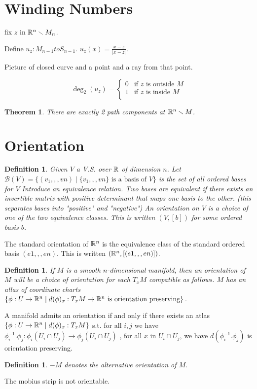 \documentclass[11pt,leqno,oneside]{amsart}
\newcommand{\de}{\emph}
\theoremstyle{mystyle} \newtheorem{thrm}[thm]{Theorem}
\theoremstyle{mystyle} \newtheorem{defi}[thm]{Definition}
\begin{document}
\section{Winding Numbers}

fix $z$ in ${\mathbb R}^n \smallsetminus M_n$.

Define $u_z : M_{n-1} to S_{n-1}$.
$u_z(x) = \frac{x-z}{|x-z|}$.

Picture of closed curve and a point and a ray from that point.

$$\deg_2(u_z) =
\begin{cases}
	0 	&\text{if $z$ is outside $M$} \\
	1 	&\text{if $z$ is inside $M$} \\
\end{cases}$$


\begin{thrm}
	There are exactly 2 path components at ${\mathbb R}^n \smallsetminus M$.
\end{thrm}

\section{Orientation}

\begin{defi}
	Given $V$ a V.S. over ${\mathbb R}$ of dimension $n$.
	Let $\mathcal{B}(V) = \{ (v_1,,,vn) \mid \{v_1,,,vn\} \text{ is a basis of } V \}$ is the set of all ordered bases for $V$
	Introduce an equivalence relation.  Two bases are equivalent if there exists an invertible matrix with positive determinant that maps one basis to the other.   (this separates bases into "positive" and "negative")
	An \de{orientation} on $V$ is a choice of one of the two equivalence classes.  This is written $(V, [b])$ for some ordered basis $b$.
\end{defi}
\begin{example}
	The standard orientation of ${\mathbb R}^n$ is the equivalence class of the standard ordered basis $(e1,,,en)$.  This is written $({\mathbb R}^n, [(e1,,,en)])$.
\end{example}
\begin{defi}
	If $M$ is a smooth $n$-dimensional manifold, then an orientation of $M$ will be a choice of orientation for each $T_xM$ compatible as follows.  $M$ has an atlas of coordinate charts $\{ \phi : U \to {\mathbb R}^n \mid d(\phi)_x : T_xM \to {\mathbb R}^n \text{ is orientation preserving} \}$.
\end{defi}
\begin{prop}
	A manifold admits an orientation if and only if there exists an atlas $\{ \phi : U \to {\mathbb R}^n \mid d(\phi)_x : T_xM \}$ s.t. for all $i,j$ we have $\phi_i^{-1}.\phi_j : \phi_i(U_i \cap U_j) \to \phi_j(U_i \cap U_j)$
	, for all $x$ in $U_i \cap U_j$, we have $d(\phi_i^{-1}.\phi_j)$ is orientation preserving.
\end{prop}
\begin{defi}
	$-M$ denotes the alternative orientation of $M$.
\end{defi}
\begin{example}
	The mobius strip is not orientable.
\end{example}
\end{document}
